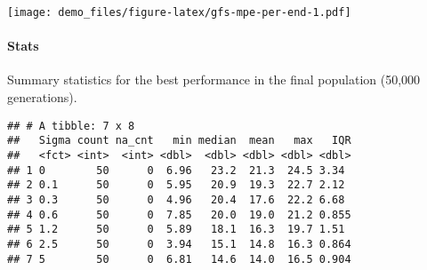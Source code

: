 \documentclass[]{book}
\newenvironment{Shaded}{\begin{snugshade}}{\end{snugshade}}
\newcommand{\DataTypeTok}[1]{\textcolor[rgb]{0.13,0.29,0.53}{#1}}
\newcommand{\KeywordTok}[1]{\textcolor[rgb]{0.13,0.29,0.53}{\textbf{#1}}}
\newcommand{\NormalTok}[1]{#1}
\newcommand{\OperatorTok}[1]{\textcolor[rgb]{0.81,0.36,0.00}{\textbf{#1}}}
\newcommand{\OtherTok}[1]{\textcolor[rgb]{0.56,0.35,0.01}{#1}}
\newcommand{\StringTok}[1]{\textcolor[rgb]{0.31,0.60,0.02}{#1}}
\let\oldparagraph\paragraph
\renewcommand{\paragraph}[1]{\oldparagraph{#1}\mbox{}}
\begin{document}
\texttt{[image: demo\_files/figure-latex/gfs-mpe-per-end-1.pdf]}

\hypertarget{stats-47}{%
\paragraph{Stats}\label{stats-47}}

Summary statistics for the best performance in the final population (50,000 generations).

\begin{Shaded}
\end{Shaded}

\begin{verbatim}
## # A tibble: 7 x 8
##   Sigma count na_cnt   min median  mean   max   IQR
##   <fct> <int>  <int> <dbl>  <dbl> <dbl> <dbl> <dbl>
## 1 0        50      0  6.96   23.2  21.3  24.5 3.34 
## 2 0.1      50      0  5.95   20.9  19.3  22.7 2.12 
## 3 0.3      50      0  4.96   20.4  17.6  22.2 6.68 
## 4 0.6      50      0  7.85   20.0  19.0  21.2 0.855
## 5 1.2      50      0  5.89   18.1  16.3  19.7 1.51 
## 6 2.5      50      0  3.94   15.1  14.8  16.3 0.864
## 7 5        50      0  6.81   14.6  14.0  16.5 0.904
\end{verbatim}
\end{document}
